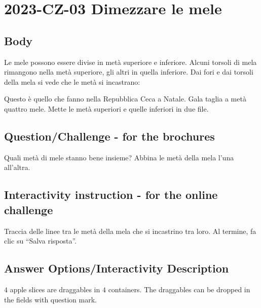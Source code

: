\documentclass[a4paper,11pt]{report}
\newcommand{\taskGraphicsFolder}{..}
\begin{document}
\section*{\centering{} 2023-CZ-03 Dimezzare le mele}


\subsection*{Body}

Le mele possono essere divise in metà superiore e inferiore.
Alcuni torsoli di mela rimangono nella metà superiore, gli altri in quella inferiore.
Dai fori e dai torsoli della mela si vede che le metà si incastrano:

{\centering%
\par}

Questo è quello che fanno nella Repubblica Ceca a Natale. Gala taglia a metà quattro mele.
Mette le metà superiori e quelle inferiori in due file.

{\em


\subsection*{Question/Challenge - for the brochures}

Quali metà di mele stanno bene insieme? Abbina le metà della mela l’una all’altra.

{\centering%
\par}

}


\subsection*{Interactivity instruction - for the online challenge}

Traccia delle linee tra le metà della mela che si incastrino tra loro. Al termine, fa clic su \enquote{Salva risposta}.

\begingroup
\renewcommand{\arraystretch}{1.5}
\subsection*{Answer Options/Interactivity Description}

$4$ apple slices are draggables in $4$ containers. The draggables can be dropped in the fields with question mark.
\end{document}
